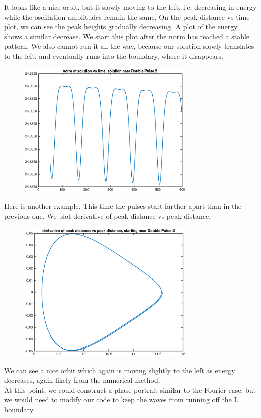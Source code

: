 \documentclass[12pt]{article}
\begin{document}
It looks like a nice orbit, but it slowly moving to the left, i.e. decreasing in energy while the oscillation amplitudes remain the same. On the peak distance vs time plot, we can see the peak heights gradually decreasing. A plot of the energy shows a similar decrease. We start this plot after the norm has reached a stable pattern. We also cannot run it all the way, because our solution slowly translates to the left, and eventually runs into the boundary, where it disappears.

\begin{figure}[H]
	\includegraphics[width=8.5cm]{1a2norm}
\end{figure}

Here is another example. This time the pulses start farther apart than in the previous one. We plot derivative of peak distance vs peak distance.

\begin{figure}[H]
	\includegraphics[width=8.5cm]{1a6deriv}
\end{figure}

We can see a nice orbit which again is moving slightly to the left as energy decreases, again likely from the numerical method.\\

At this point, we could construct a phase portrait similar to the Fourier case, but we would need to modify our code to keep the waves from running off the L boundary.
\end{document}
